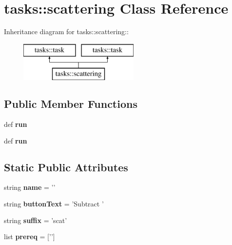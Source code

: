 \section{tasks::scattering Class Reference}
\label{classtasks_1_1scattering}
Inheritance diagram for tasks::scattering::\begin{figure}[H]
\begin{center}
\leavevmode
\includegraphics[height=2cm]{classtasks_1_1scattering}
\end{center}
\end{figure}
\subsection*{Public Member Functions}
\begin{CompactItemize}
\item 
def \textbf{run}\label{classtasks_1_1scattering_6a8bc937f9d90d5b323c43181cb49c90}

\item 
def \textbf{run}\label{classtasks_1_1scattering_6a8bc937f9d90d5b323c43181cb49c90}

\end{CompactItemize}
\subsection*{Static Public Attributes}
\begin{CompactItemize}
\item 
string \textbf{name} = '{\bfscattering}'\label{classtasks_1_1scattering_97d7e7a54a8fa2fb744b92b4d2f6b264}

\item 
string \textbf{button\-Text} = 'Subtract {\bfscattering}'\label{classtasks_1_1scattering_10415ad70b14c3799a96c2a8e04e4424}

\item 
string \textbf{suffix} = 'scat'\label{classtasks_1_1scattering_de1786871cb2f4d87faa22845f407226}

\item 
list \textbf{prereq} = ['{\bfpreproc}']\label{classtasks_1_1scattering_5d6fbe8a4bf1272f8da527289b3babaf}

\end{CompactItemize}



